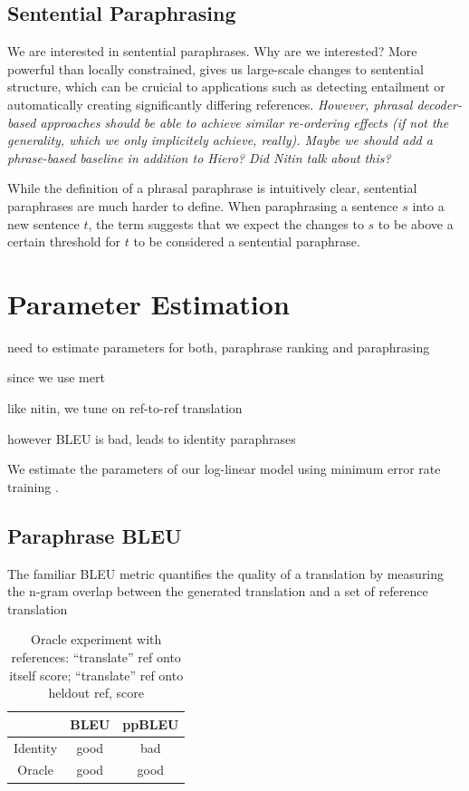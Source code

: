 \documentclass[11pt]{article}
\begin{document}
\subsection{Sentential Paraphrasing} \label{sentential_paraphrasing}

We are interested in sentential paraphrases. Why are we interested?
More powerful than locally constrained, gives us large-scale changes
to sentential structure, which can be cruicial to applications such as
detecting entailment or automatically creating significantly differing
references. \emph{However, phrasal decoder-based approaches should be
  able to achieve similar re-ordering effects (if not the generality,
  which we only implicitely achieve, really). Maybe we should add a
  phrase-based baseline in addition to Hiero? Did Nitin talk about
  this?}

While the definition of a phrasal paraphrase is intuitively clear,
sentential paraphrases are much harder to define. When paraphrasing a
sentence $s$ into a new sentence $t$, the term suggests that we expect
the changes to $s$ to be above a certain threshold for $t$ to be
considered a sentential paraphrase.


\section{Parameter Estimation} 
\label{adaptation}

need to estimate parameters for both, paraphrase ranking and paraphrasing

since we use  mert

like nitin, we tune on ref-to-ref translation

however BLEU is bad, leads to identity paraphrases


We estimate the parameters of our log-linear model using minimum error
rate training \cite{Och2003}.

\subsection{Paraphrase BLEU} \label{pp_bleu}

The familiar BLEU metric \cite{Papineni2002} quantifies the quality of
a translation by measuring the n-gram overlap between the generated
translation and a set of reference translation

\begin{table}
\begin{center}
\begin{tabular}{|c|c|c|}
  \hline
  & BLEU & ppBLEU \\
  \hline
  Identity & good & bad \\
  Oracle & good & good \\
  \hline
\end{tabular}
\end{center}
\caption{Oracle experiment with references: ``translate'' ref onto
  itself score; ``translate'' ref onto heldout ref, score}
\end{table}
\end{document}
